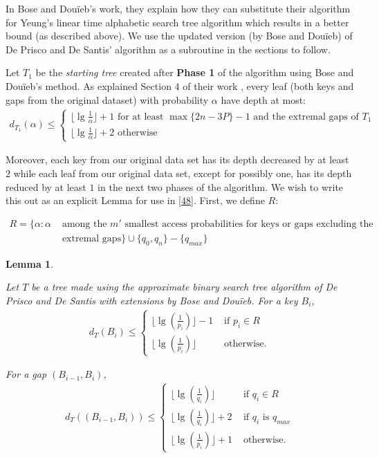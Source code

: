 \documentclass[letterpaper,12pt,titlepage,oneside,final]{book}
\theoremstyle{plain}
\newtheorem{lem}[thm]{Lemma}
\begin{document}
In Bose and Dou\"{i}eb's work, they explain how they can substitute their algorithm for Yeung's linear time alphabetic search tree algorithm which results in a better bound (as described above). We use the updated version (by Bose and Dou\"{i}eb) of De Prisco and De Santis' algorithm as a subroutine in the sections to follow.

Let $T_1$ be the \textit{starting tree} created after \textbf{Phase 1} of the algorithm using Bose and Dou\"{i}eb's method. As explained Section 4 of their work \cite{bose2009efficient}, every leaf (both keys and gaps from the original dataset) with probability $\alpha$ have depth at most:
\begin{align*}
d_{T_1}(\alpha) \leq
\begin{cases}
\lfloor \lg \frac{1}{\alpha} \rfloor + 1 \text{ for at least } \max\{2n-3P\}-1 \text{ and the extremal gaps of } T_1 \\
\lfloor \lg \frac{1}{\alpha} \rfloor + 2 \text{ otherwise}
\end{cases}
\end{align*}

Moreover, each key from our original data set has its depth decreased by at least $2$ while each leaf from our original data set, except for possibly one, has its depth reduced by at least $1$ in the next two phases of the algorithm. We wish to write this out as an explicit Lemma for use in \ref{48}. First, we define $R$:

\begin{align*}
R = \{\alpha : \alpha &\text{ among the }m' \text{ smallest access probabilities for keys or gaps excluding the} \\
&\text{ extremal gaps} \} \cup \{q_0, q_n\} - \{q_{max}\}
\end{align*}

\begin{lem} \label{ApprBSTLem}

Let $T$ be a tree made using the approximate binary search tree algorithm of De Prisco and De Santis with extensions by Bose and Dou\"{i}eb. For a key $B_i$,
\begin{align*} 
d_T(B_i) \leq
\begin{cases}  
\lfloor \lg(\frac{1}{p_i}) \rfloor - 1 &\text{ if } p_i \in R  \\
\lfloor \lg(\frac{1}{p_i}) \rfloor &\text{ otherwise.}
\end{cases}
\end{align*}

For a gap $(B_{i-1},B_i)$,
\begin{align*}
d_T((B_{i-1},B_i)) \leq
\begin{cases}  
\lfloor \lg(\frac{1}{q_i}) \rfloor &\text{ if } q_i \in R  \\
\lfloor \lg(\frac{1}{q_i}) \rfloor + 2 &\text{ if } q_i \text{ is } q_{max} \\
\lfloor \lg(\frac{1}{p_i}) \rfloor + 1 &\text{ otherwise.}
\end{cases}
\end{align*}
  
\end{lem}
\end{document}
